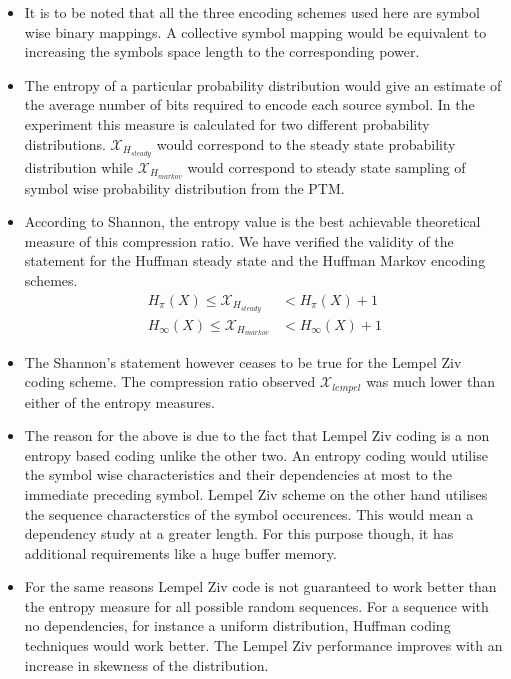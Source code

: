 \documentclass[a4paper,10pt]{article}
\begin{document}
\begin{itemize}
\item{It is to be noted that all the three encoding schemes used here are symbol wise binary mappings. A collective symbol mapping would be equivalent to increasing the symbols space length to the corresponding power.}

\item{The entropy of a particular probability distribution would give an estimate of the average number of bits required to encode each source symbol. In the experiment this measure is calculated for two different probability distributions. $\mathcal{X}_{H_{steady}}$ would correspond to the steady state probability distribution while $\mathcal{X}_{H_{markov}}$ would correspond to steady state sampling of symbol wise probability distribution from the PTM.}

\item{According to Shannon, the entropy value is the best achievable theoretical measure of this compression ratio. We have verified the validity of the statement for the Huffman steady state and the Huffman Markov encoding schemes.
\begin{align*}
H_{\pi}(X) \leq \mathcal{X}_{H_{steady}} &< H_{\pi}(X) + 1 \\
H_{\infty}(X) \leq \mathcal{X}_{H_{markov}} &< H_{\infty}(X) + 1
\end{align*}
}

\item{The Shannon's statement however ceases to be true for the Lempel Ziv coding scheme. The compression ratio observed $\mathcal{X}_{lempel}$ was much lower than either of the entropy measures.}

\item{The reason for the above is due to the fact that Lempel Ziv coding is a non entropy based coding unlike the other two. An entropy coding would utilise the symbol wise characteristics and their dependencies at most to the immediate preceding symbol. Lempel Ziv scheme on the other hand utilises the sequence characterstics of the symbol occurences. This would mean a dependency study at a greater length. For this purpose though, it has additional requirements like a huge buffer memory.}

\item{For the same reasons Lempel Ziv code is not guaranteed to work better than the entropy measure for all possible random sequences. For a sequence with no dependencies, for instance a uniform distribution, Huffman coding techniques would work better. The Lempel Ziv performance improves with an increase in skewness of the distribution.}
\end{itemize}
\end{document}
